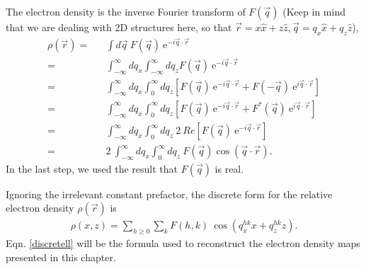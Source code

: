 The electron density is the inverse Fourier transform of $F(\vec{q})$
(Keep in mind that we are dealing with 2D structures here, so that
\( \vec{r} = x \hat{x} + z \hat{z}, \vec{q} = q_x \hat{x} + q_z \hat{z}\)),
\begin{eqnarray}
\label{edrecon}
\rho(\vec{r}) =&& \int d \vec{q}\ F(\vec{q})\ 
\mbox{e}^{- i \vec{q} \cdot \vec{r}}\nonumber\\
=&& \int_{- \infty}^{\infty} dq_x \int_{- \infty}^{\infty} dq_z
F(\vec{q})\ \mbox{e}^{- i \vec{q} \cdot \vec{r}}\nonumber\\
=&& \int_{- \infty}^{\infty} dq_x \int_{0}^{\infty} dq_z
\left[ F(\vec{q})\ \mbox{e}^{- i \vec{q} \cdot \vec{r}} +
F(-\vec{q})\ \mbox{e}^{i \vec{q} \cdot \vec{r}}\right]\nonumber\\
=&& \int_{- \infty}^{\infty} dq_x \int_{0}^{\infty} dq_z
\left[ F(\vec{q})\ \mbox{e}^{- i \vec{q} \cdot \vec{r}} +
F^{*}(\vec{q})\ \mbox{e}^{i \vec{q} \cdot \vec{r}}\right]\nonumber\\
=&& \int_{- \infty}^{\infty} dq_x \int_{0}^{\infty} dq_z
\ 2\ Re \left[ F(\vec{q})\ \mbox{e}^{- i \vec{q} \cdot \vec{r}}\right]\nonumber\\
=&& 2\ \int_{- \infty}^{\infty} dq_x \int_{0}^{\infty} dq_z
\ F(\vec{q}) \cos( \vec{q} \cdot \vec{r}).
\end{eqnarray}
In the last step, we used the result that $F(\vec{q})$ is real.

Ignoring the irrelevant constant prefactor, the discrete form for 
the relative electron density $\rho(\vec{r})$ is 
\begin{eqnarray}
\label{discretell}
\rho(x,z) = \sum_{h \geq 0} \sum_{k} F(h,k) \ \cos(q^{hk}_x x + q^{hk}_z z).
\end{eqnarray}
Eqn. \ref{discretell} will be the formula used to reconstruct the electron 
density maps presented in this chapter. 

\pagebreak
